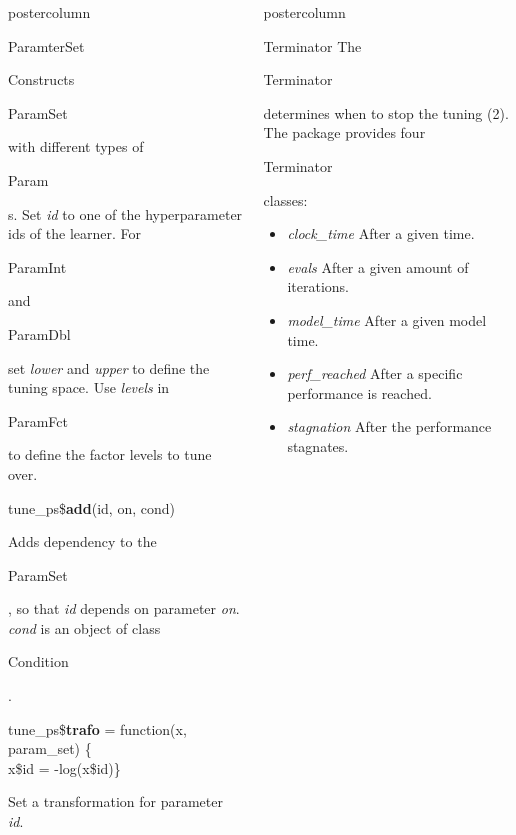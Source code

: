 \documentclass{beamer}
\newlength{\columnheight} %
\newcommand{\codeinline}[1]{\begin{codeboxinline}#1\end{codeboxinline}}
\begin{document}
\begin{frame}[fragile]{}
\begin{columns}
\begin{column}{.245\textwidth}
\begin{beamercolorbox}[center]{postercolumn}
\begin{minipage}{.98\textwidth}
{\begin{myblock}{ParamterSet}
\begin{codeboxmultiline}[width=19cm]
							\end{codeboxmultiline}
							Constructs \codeinline{ParamSet} with different types of \codeinline{Param}s. Set \textit{id} to one of the hyperparameter ids of the learner. For  \codeinline{ParamInt} and \codeinline{ParamDbl} set \textit{lower} and \textit{upper} to define the tuning space. Use \textit{levels} in \codeinline{ParamFct} to define the factor levels to tune over.
							\\
							\begin{codebox}
								tune\_ps\$\textbf{add}(id, on, cond)
							\end{codebox}
							Adds dependency to the \codeinline{ParamSet}, so that \textit{id} depends on parameter \textit{on}.
							\textit{cond} is an object of class \codeinline{Condition}.
							\\
							\begin{codeboxmultiline}[width=21cm]
								tune\_ps\$\textbf{trafo} = function(x, param\_set) \{ \\
								\hspace*{1ex}x\$id = -log(x\$id)\}
							\end{codeboxmultiline}
							Set a transformation for parameter \textit{id}.
						\end{myblock}
						\vfill}
				\end{minipage}
			\end{beamercolorbox}
		\end{column}
		\begin{column}{.245\textwidth}
			\begin{beamercolorbox}[center]{postercolumn}
				\begin{minipage}{.98\textwidth}
					\parbox[t][\columnheight]{\textwidth}{
						\begin{myblock}{Terminator}
							The \codeinline{Terminator} determines when to stop the tuning (2). The package provides four \codeinline{Terminator} classes:
							\\
							\begin{itemize}
								\item \textit{clock\_time} After a given time.
								\item \textit{evals} After a given amount of iterations.
								\item \textit{model\_time} After a given model time.
								\item \textit{perf\_reached} After a specific performance is reached.
								\item \textit{stagnation} After the performance stagnates.

\end{itemize}
\end{myblock}}
\end{minipage}
\end{beamercolorbox}
\end{column}
\end{columns}
\end{frame}
\end{document}
